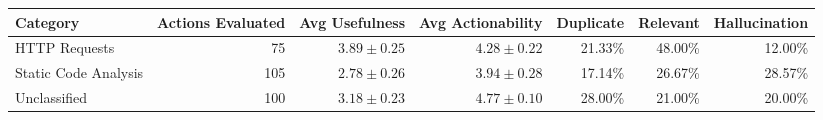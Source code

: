 \begin{tabular}{lrrrrrr}
\toprule
Category & Actions Evaluated & Avg Usefulness & Avg Actionability & Duplicate & Relevant & Hallucination \\
\midrule
HTTP Requests & 75 & \( 3.89 \pm 0.25 \) & \( 4.28 \pm 0.22 \) & 21.33\% & 48.00\% & 12.00\% \\
Static Code Analysis & 105 & \( 2.78 \pm 0.26 \) & \( 3.94 \pm 0.28 \) & 17.14\% & 26.67\% & 28.57\% \\
Unclassified & 100 & \( 3.18 \pm 0.23 \) & \( 4.77 \pm 0.10 \) & 28.00\% & 21.00\% & 20.00\% \\
\bottomrule
\end{tabular}
